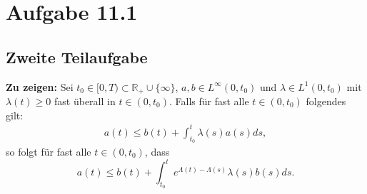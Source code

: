 \documentclass[a4paper]{article}
\theoremstyle{plain}
\begin{document}
	
	\section*{Aufgabe 11.1}
	\subsection*{Zweite Teilaufgabe}
	\textbf{Zu zeigen: } Sei $t_0 \in [0,T) \subset \mathbb R_+ \cup \{ \infty \}$, $a,b \in L^{\infty}(0,t_0)$ und $\lambda \in L^1(0,t_0)$ mit $\lambda(t) \geq 0$ fast überall in $t \in (0,t_0)$. Falls für fast alle $t \in (0,t_0)$ folgendes gilt: 
	\begin{align}\label{maus}
		a(t) \leq b(t) + \int^t_{t_0} \lambda(s) a(s) ds,
	\end{align}
	so folgt für fast alle $t \in (0,t_0)$, dass
	\[
		a(t) \leq b(t) + \int^t_{t_0} e^{\Lambda(t) - \Lambda(s)} \lambda(s) b(s) ds.
	\]
	
\end{document}
